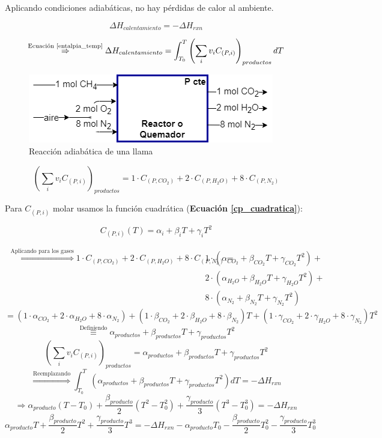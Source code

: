     \begin{multicols}{2}
        Aplicando condiciones adiabáticas, no hay pérdidas de calor al ambiente.
        
        \[\Delta H_{calentamiento} = -\Delta H_{rxn}\]
        
        \[\overset{\text{Ecuación \ref{entalpia_temp}}}{\Rightarrow} \Delta H_ {calentamiento}= \int_{T_{0}}^{T} \left ( \sum_{i}v_{i}C_{(P, i)} \right )_{productos} dT\]
        
        \begin{figure}[H]
            \caption{Reacción adiabática de una llama}
            \label{fig:com_llama}
            \includegraphics[width=\textwidth]{img/esquemas/llama_adiabatica.png}
        \end{figure}
    \end{multicols}
    
    \[\left ( \sum_{i}v_{i}C_{(P, i)} \right )_{productos} = 1\cdot C_{(P, CO_{2})} + 2\cdot C_{(P, H_{2}O)} + 8\cdot C_{(P, N_{2})}\]
    
    Para \(C_{(P, i)}\) molar usamos la función cuadrática (\textbf{Ecuación \ref{cp_cuadratica}}):
    
    \[C_{(P, i)}(T)=\alpha_{i} + \beta_{i}T + \gamma_{i}T^{2}\]
    
    \[\begin{matrix}
        \overset{\text{Aplicando para los gases}}{\Rightarrow} 1\cdot C_{(P, CO_{2})} + 2\cdot C_{(P, H_{2}O)} + 8\cdot C_{(P, N_{2})} = & 1\cdot (\alpha_{CO_{2}} + \beta_{CO_{2}}T + \gamma_{CO_{2}}T^{2}) + \\
        & 2\cdot(\alpha_{H_{2}O} + \beta_{H_{2}O}T + \gamma_{H_{2}O}T^{2}) + \\
        & 8\cdot(\alpha_{N_{2}} + \beta_{N_{2}}T + \gamma_{N_{2}}T^{2})
    \end{matrix}\]
    \[=(1\cdot\alpha_{CO_{2}} + 2\cdot\alpha_{H_{2}O} + 8\cdot\alpha_{N_{2}}) + (1\cdot\beta_{CO_{2}} + 2\cdot\beta_{H_{2}O} + 8\cdot\beta_{N_{2}})T 
    + (1\cdot\gamma_{CO_{2}} + 2\cdot\gamma_{H_{2}O} + 8\cdot\gamma_{N_{2}})T^{2}\]
    \[\overset{\text{Definiendo}}{\equiv} \alpha_{productos} + \beta_{productos}T + \gamma_{productos}T^{2}\]
    \[\left ( \sum_{i}v_{i}C_{(P, i)} \right )_{productos} = \alpha_{productos} + \beta_{productos}T + \gamma_{productos}T^{2}\]
    \[\overset{\text{Reemplazando}}{\Rightarrow} \int_{T_{0}}^{T} (\alpha_{productos} + \beta_{productos}T + \gamma_{productos}T^{2}) dT = -\Delta H_{rxn}\]
    \[\Rightarrow \alpha_{producto}(T - T_{0}) + \frac{\beta_{producto}}{2}(T^{2} - T_{0}^{2}) + \frac{\gamma_{producto}}{3}(T^{3} - T_{0}^{3})=-\Delta H_{rxn}\]
    \[\alpha_{producto}T+\frac{\beta_{producto}}{2}T^{2} + \frac{\gamma_{producto}}{3}T^{3} = -\Delta H_{rxn} - \alpha_{producto}T_{0}-\frac{\beta_{producto}}{2}T_{0}^{2} - \frac{\gamma_{producto}}{3}T_{0}^{3}\]
    
